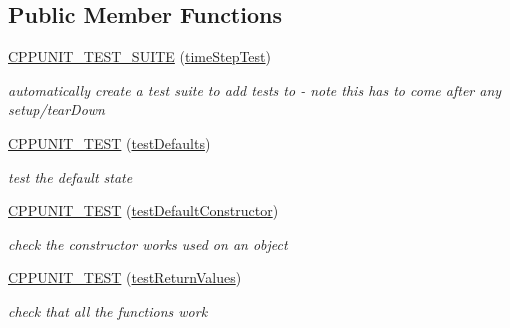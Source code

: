 \subsection*{Public Member Functions}
\begin{DoxyCompactItemize}
\item 
\mbox{\label{classtimeStepTest_a33172d5eb5f67ad6eb8ef3e04baed49c}} 
\mbox{\hyperlink{classtimeStepTest_a33172d5eb5f67ad6eb8ef3e04baed49c}{C\+P\+P\+U\+N\+I\+T\+\_\+\+T\+E\+S\+T\+\_\+\+S\+U\+I\+TE}} (\mbox{\hyperlink{classtimeStepTest}{time\+Step\+Test}})
\begin{DoxyCompactList}\small\item\em automatically create a test suite to add tests to -\/ note this has to come after any setup/tear\+Down \end{DoxyCompactList}\item 
\mbox{\label{classtimeStepTest_a8dd61267ca389d04a8db4776b64eee9a}} 
\mbox{\hyperlink{classtimeStepTest_a8dd61267ca389d04a8db4776b64eee9a}{C\+P\+P\+U\+N\+I\+T\+\_\+\+T\+E\+ST}} (\mbox{\hyperlink{classtimeStepTest_ae501f2f63633a2b24c4cfc1f9c33f96b}{test\+Defaults}})
\begin{DoxyCompactList}\small\item\em test the default state \end{DoxyCompactList}\item 
\mbox{\label{classtimeStepTest_a215e48294ca13fb21cd703e31e80bf48}} 
\mbox{\hyperlink{classtimeStepTest_a215e48294ca13fb21cd703e31e80bf48}{C\+P\+P\+U\+N\+I\+T\+\_\+\+T\+E\+ST}} (\mbox{\hyperlink{classtimeStepTest_a3e6e3abcb3b887cd3ebbbacb3c6a812f}{test\+Default\+Constructor}})
\begin{DoxyCompactList}\small\item\em check the constructor works used on an object \end{DoxyCompactList}\item 
\mbox{\label{classtimeStepTest_a83693f088afb5b02ca85ede22866efbf}} 
\mbox{\hyperlink{classtimeStepTest_a83693f088afb5b02ca85ede22866efbf}{C\+P\+P\+U\+N\+I\+T\+\_\+\+T\+E\+ST}} (\mbox{\hyperlink{classtimeStepTest_abb17f1970e1ec459c524ef87870f651f}{test\+Return\+Values}})
\begin{DoxyCompactList}\small\item\em check that all the functions work \end{DoxyCompactList}\item 

\end{DoxyCompactItemize}
